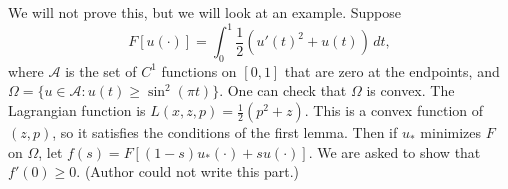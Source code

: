 \documentclass[11pt]{article}
\begin{document}
We will not prove this, but we will look at an example. Suppose
\[
F[u(\cdot)] = \int_0^1 \frac{1}{2} \left( u'(t)^2 + u(t) \right) \, dt,
\]
where $\mathcal{A}$ is the set of $C^1$ functions on $[0, 1]$ that are zero at the endpoints, and $\Omega = \{ u \in \mathcal{A} : u(t) \geq \sin^2(\pi t) \}$. One can check that $\Omega$ is convex. The Lagrangian function is $L(x,z,p) = \frac{1}{2}(p^2 + z)$. This is a convex function of $(z,p)$, so it satisfies the conditions of the first lemma. Then if $u_*$ minimizes $F$ on $\Omega$, let $f(s) = F[(1 - s)u_*(\cdot) + su(\cdot)]$. We are asked to show that $f'(0) \geq 0$. (Author could not write this part.)
\end{document}
